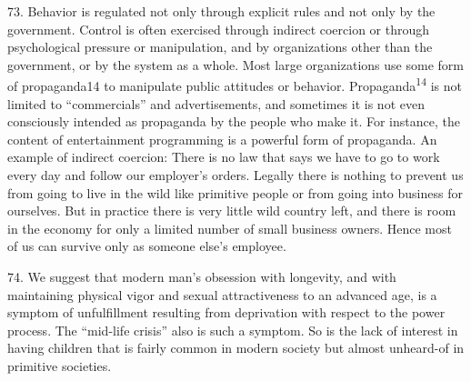 \documentclass{article}
\begin{document}
73. Behavior is regulated not only through explicit rules and not only by the government. Control 
is often exercised through indirect coercion or through psychological pressure or manipulation, 
and by organizations other than the government, or by the system as a whole. Most large 
organizations use some form of propaganda14 to manipulate public attitudes or 
behavior. Propaganda\textsuperscript{14} is not limited to “commercials” and advertisements, and sometimes it is not 
even consciously intended as propaganda by the people who make it. For instance, the content of 
entertainment programming is a powerful form of propaganda. An example of indirect coercion: 
There is no law that says we have to go to work every day and follow our employer’s 
orders. Legally there is nothing to prevent us from going to live in the wild like primitive people 
or from going into business for ourselves. But in practice there is very little wild country left, and 
there is room in the economy for only a limited number of small business owners. Hence most of 
us can survive only as someone else’s employee. \vspace{\baselineskip}

74. We suggest that modern man’s obsession with longevity, and with maintaining physical vigor 
and sexual attractiveness to an advanced age, is a symptom of unfulfillment resulting from 
deprivation with respect to the power process. The “mid-life crisis” also is such a symptom. So 
is the lack of interest in having children that is fairly common in modern society but almost 
unheard-of in primitive societies. \vspace{\baselineskip}
\end{document}
